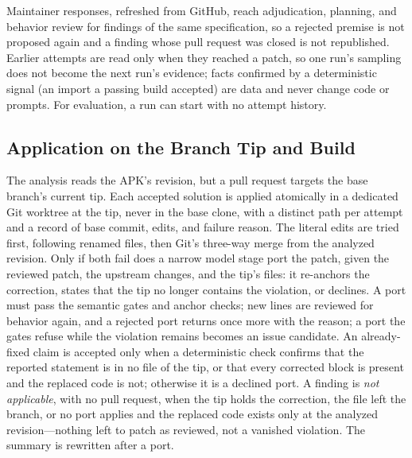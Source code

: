 \documentclass[conference]{IEEEtran}
\begin{document}
Maintainer responses, refreshed from GitHub, reach adjudication, planning, and
behavior review for findings of the same specification, so a rejected premise
is not proposed again and a finding whose pull request was closed is not
republished. Earlier attempts are read only when they reached a patch, so one
run's sampling does not become the next run's evidence; facts confirmed by a
deterministic signal (an import a passing build accepted) are data and never
change code or prompts. For evaluation, a run can start with no attempt
history.

\subsection{Application on the Branch Tip and Build}

The analysis reads the APK's revision, but a pull request targets the base
branch's current tip. Each accepted solution is applied atomically in a
dedicated Git worktree at the tip, never in the base clone, with a distinct
path per attempt and a record of base commit, edits, and failure reason. The
literal edits are tried first, following renamed files, then Git's three-way
merge from the analyzed revision. Only if both fail does a narrow model stage
port the patch, given the reviewed patch, the upstream changes, and the tip's
files: it re-anchors the correction, states that the tip no longer contains the
violation, or declines. A port must pass the semantic gates and anchor checks;
new lines are reviewed for behavior again, and a rejected port returns once
more with the reason; a port the gates refuse while the violation remains
becomes an issue candidate. An already-fixed claim is accepted only when a
deterministic check confirms that the reported statement is in no file of the
tip, or that every corrected block is present and the replaced code is not;
otherwise it is a declined port. A finding is \emph{not applicable}, with no
pull request, when the tip holds the correction, the file left the branch, or
no port applies and the replaced code exists only at the analyzed
revision---nothing left to patch as reviewed, not a vanished violation. The
summary is rewritten after a port.
\end{document}
